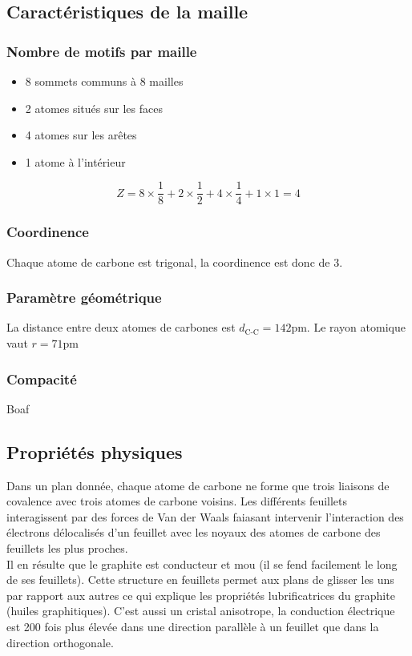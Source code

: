 \subsection{Caractéristiques de la maille}
\subsubsection{Nombre de motifs par maille}

\begin{itemize}
    \item 8 sommets communs à 8 mailles
    \item 2 atomes situés sur les faces
    \item 4 atomes sur les arêtes
    \item 1 atome à l'intérieur
\end{itemize}
\begin{equation}
    Z = 8 \times \frac{1}{8} + 2 \times \frac{1}{2} + 4 \times
    \frac{1}{4} + 1 \times 1 = 4
\end{equation}
\subsubsection{Coordinence}
Chaque atome de carbone est trigonal, la coordinence
est donc de 3.
\subsubsection{Paramètre géométrique}
La distance entre deux atomes de carbones est $d_\text{C-C} = 142$pm.
Le rayon atomique vaut $r = 71$pm
\subsubsection{Compacité}
Boaf

\subsection{Propriétés physiques}
Dans un plan donnée, chaque atome de carbone ne forme que trois
liaisons de covalence avec trois atomes de carbone voisins.
Les différents feuillets interagissent par des forces de Van der
Waals faiasant intervenir l'interaction des électrons délocalisés
d'un feuillet avec les noyaux des atomes de carbone des feuillets
les plus proches.\\
Il en résulte que le graphite est
conducteur et mou (il se fend facilement le long de ses feuillets).
Cette structure en feuillets permet aux plans de glisser les uns
par rapport aux autres ce qui explique les propriétés lubrificatrices
du graphite (huiles graphitiques). C'est aussi un cristal anisotrope,
la conduction électrique est 200 fois plus élevée dans une direction
parallèle à un feuillet que dans la direction orthogonale.


